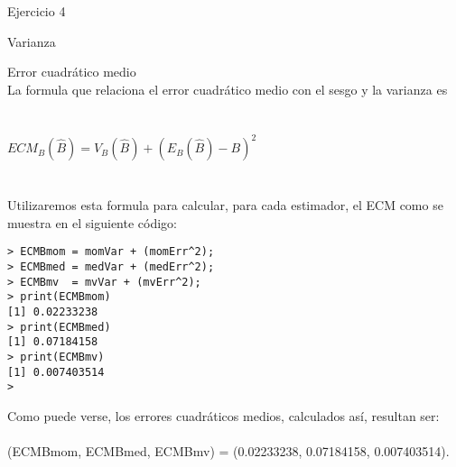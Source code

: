 \begin{section}{Ejercicio 4}
\begin{subsection}{Varianza}
\end{subsection}
\begin{subsection}{Error cuadrático medio}~\\

La formula que relaciona el error cuadrático medio con el sesgo y la varianza es \\
~\\
~\\
$ECM_B(\hat{B}) = V_B(\hat{B}) + (E_B(\hat{B}) - B)^2$\\
~\\
~\\
Utilizaremos esta formula para calcular, para cada estimador, el ECM como se muestra en el siguiente código:

\begin{verbatim}
> ECMBmom = momVar + (momErr^2);
> ECMBmed = medVar + (medErr^2);
> ECMBmv  = mvVar + (mvErr^2);
> print(ECMBmom)
[1] 0.02233238
> print(ECMBmed)
[1] 0.07184158
> print(ECMBmv)
[1] 0.007403514
> 
\end{verbatim}

Como puede verse, los errores cuadráticos medios, calculados así, resultan ser:\\
~\\
(ECMBmom, ECMBmed, ECMBmv) = (0.02233238, 0.07184158, 0.007403514).
~\\
\end{subsection}
\end{section}